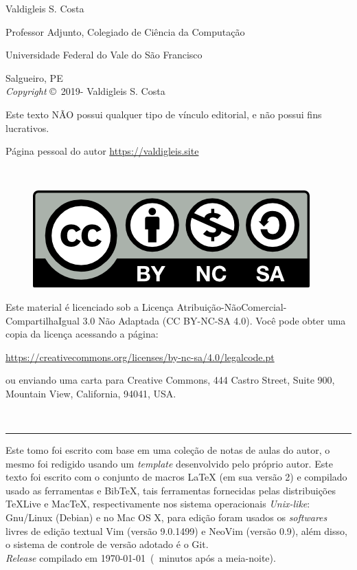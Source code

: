 \begingroup

\newpage
\thispagestyle{empty}

\noindent Valdigleis S. Costa

\noindent Professor Adjunto, Colegiado de Ciência da Computação

\noindent Universidade Federal do Vale do São Francisco

\noindent Salgueiro, PE\\

\noindent \textit{Copyright} \copyright\ 2019-{\the\year} Valdigleis S. Costa

\noindent Este texto  \textsc{NÃO}  possui qualquer tipo de vínculo editorial, e não possui fins lucrativos.

\noindent Página pessoal do autor \url{https://valdigleis.site}

~\vfill

\thispagestyle{empty}

\begin{figure}[h]
	\centering
	\includegraphics[width=0.15\linewidth]{fig/license}
\end{figure}
\noindent Este material é licenciado sob a Licença Atribuição-NãoComercial-CompartilhaIgual 3.0 Não Adaptada (CC BY-NC-SA 4.0).  Você pode obter uma copia da licença acessando a página: 
\begin{center}
	\url{https://creativecommons.org/licenses/by-nc-sa/4.0/legalcode.pt}
\end{center}
\noindent ou enviando uma carta para Creative Commons, 444 Castro Street, Suite 900, Mountain View, California, 94041, USA.

~\vfill

\hrule
\vspace*{1cm}

\noindent Este tomo foi escrito com base em uma coleção de notas de aulas do autor, o mesmo foi redigido usando um \textit{template} desenvolvido pelo próprio autor. Este texto foi escrito com o conjunto de macros {\LaTeX} ({\color{NordAurora1}em sua versão 2}) e compilado usado as ferramentas {\LuaLaTeX} e {Bib\TeX}, tais ferramentas fornecidas pelas distribuições {\TeX}Live e Mac{\TeX}, respectivamente  nos sistema operacionais \textit{Unix-like}: Gnu/Linux ({\color{NordAurora1}Debian}) e no Mac OS X, para edição foram usados os \textit{softwares} livres  de edição textual Vim ({\color{NordAurora1}versão 9.0.1499}) e NeoVim ({\color{NordAurora1}versão 0.9}), além disso, o sistema de controle de versão adotado é o Git. \\ 

\noindent \textit{Release} compilado em \today\ (\MinutesAfterMidnight\ minutos após a meia-noite). %

\endgroup
